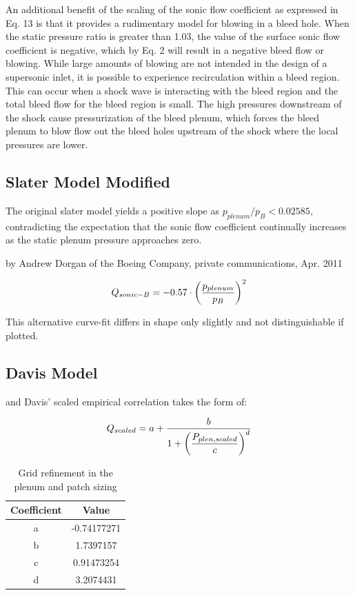 \documentclass{article}
\begin{document}
An additional benefit of the scaling of the sonic flow coefficient as expressed in Eq. 13 is that it provides a rudimentary model for blowing in a bleed hole. When the static pressure ratio is greater than 1.03, the value of the surface sonic flow coefficient is negative, which by Eq. 2 will result in a negative bleed flow or blowing. While large amounts of blowing are not intended in the design of a supersonic inlet, it is possible to experience recirculation within a bleed region. This can occur when a shock wave is interacting with the bleed region and the total bleed flow for the bleed region is small. The high pressures downstream of the shock cause pressurization of the bleed plenum, which forces the bleed plenum to blow flow out the bleed holes upstream of the shock where the local pressures are lower.



\subsection{Slater Model Modified}

The original slater model yields a positive slope as $p_{plenum}/p_B < 0.02585 $, contradicting the expectation that the sonic flow coefficient continually increases as the static plenum pressure approaches zero.

by Andrew Dorgan of the Boeing Company, private communications, Apr. 2011

$$ Q_{sonic-B} = -0.57 \cdot \qty(\frac{p_{plenum}}{p_B})^2 $$

This alternative curve-fit differs in shape only slightly and not distinguishable if plotted.


\subsection{Davis Model}

and Davis' scaled empirical correlation takes the form of:


$$ Q_{scaled} = a + \dfrac{b}{1+\qty(\dfrac{P_{plen,scaled}}{c})^d} $$

\begin{table}[!htbp] \centering 
\begin{tabular}[c]{*{2}{|c}|} \hline
\textbf{Coefficient} & \textbf{Value}   \\ \hline
a   & -0.74177271 \\ \hline
b   &  1.7397157  \\ \hline
c   &  0.91473254 \\ \hline
d   &  3.2074431  \\ \hline
\end{tabular} 
\caption{Grid refinement in the plenum and patch sizing} 
\label{tab:davis1} \end{table}
\end{document}
